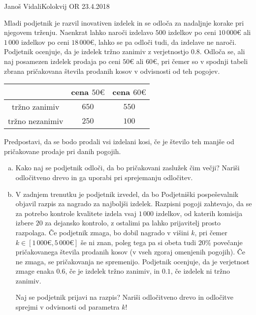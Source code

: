 \begin{naloga}{Janoš Vidali}{Kolokvij OR 23.4.2018}
\begin{vprasanje}
Mladi podjetnik je razvil inovativen izdelek
in se odloča za nadaljnje korake pri njegovem trženju.
Naenkrat lahko naroči izdelavo $500$ izdelkov po ceni $10\,000 €$
ali $1\,000$ izdelkov po ceni $18\,000 €$,
lahko se pa odloči tudi, da izdelave ne naroči.
Podjetnik ocenjuje, da je izdelek tržno zanimiv z verjetnostjo $0.8$.
Odloča se, ali naj posamezen izdelek prodaja po ceni $50 €$ ali $60 €$,
pri čemer so v spodnji tabeli zbrana pričakovana števila prodanih kosov
v odvisnosti od teh pogojev.

\begin{center}
\begin{tabular}{c|cc}
& cena $50 €$ & cena $60 €$ \\
\hline
tržno zanimiv & $650$ & $550$ \\
tržno nezanimiv & $250$ & $100$ \\
\end{tabular}
\end{center}

Predpostavi, da se bodo prodali vsi izdelani kosi,
če je število teh manjše od pričakovane prodaje pri danih pogojih.

\begin{enumerate}[(a)]
\item Kako naj se podjetnik odloči, da bo pričakovani zaslužek čim večji?
Nariši od\-lo\-čit\-ve\-no drevo in ga uporabi pri sprejemanju odločitev.

\item V zadnjem trenutku je podjetnik izvedel,
da bo Podjetniški pospeševalnik objavil
razpis za nagrado za najboljši izdelek.
Razpisni pogoji zahtevajo,
da se za potrebo kontrole kvalitete izdela vsaj $1\,000$ izdelkov,
od katerih komisija izbere $20$ za dejansko kontrolo,
z ostalimi pa lahko prijavitelj prosto razpolaga.
Če podjetnik zmaga, bo dobil nagrado v višini $k$,
pri čemer $k \in [1\,000 €, 5\,000 €]$ še ni znan,
poleg tega pa si obeta tudi $20\%$ povečanje
pričakovanega števila prodanih kosov (v vseh zgoraj omenjenih pogojih).
Če ne zmaga, se pričakovanja ne spremenijo.
Podjetnik ocenjuje, da je verjetnost zmage enaka $0.6$,
če je izdelek tržno zanimiv,
in $0.1$, če izdelek ni tržno zanimiv.

Naj se podjetnik prijavi na razpis?
Nariši odločitveno drevo in odločitve sprejmi v odvisnosti od parametra $k$!
\end{enumerate}
\end{vprasanje}


\end{naloga}

